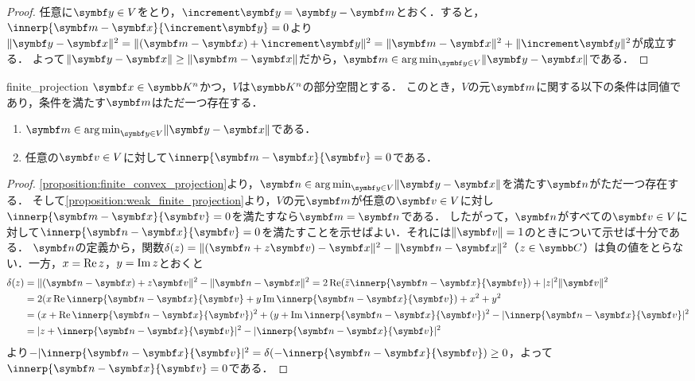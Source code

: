 \documentclass[../../main]{subfiles}
\begin{document}
\begin{proof}
  任意に\(\vect{y}\in V\)をとり，\(\increment\vect{y}=\vect{y}-\vect{m}\)とおく．すると，\(\innerp{\vect{m}-\vect{x}}{\increment\vect{y}}=0\)より
  \(\vnorm{\vect{y}-\vect{x}}^2=\vnorm{(\vect{m}-\vect{x})+\increment\vect{y}}^2=\vnorm{\vect{m}-\vect{x}}^2+\vnorm{\increment\vect{y}}^2\)が成立する．
  よって\(\vnorm{\vect{y}-\vect{x}}\geq\vnorm{\vect{m}-\vect{x}}\)だから，\(\vect{m}\in\argmin_{\vect{y}\in V}\vnorm{\vect{y}-\vect{x}}\)である．
\end{proof}

\begin{proposition}{}{finite_projection}
  \(\vect{x}\in\numset{K}^n\)かつ，\(V\)は\(\numset{K}^n\)の部分空間とする．
  このとき，\(V\)の元\(\vect{m}\)に関する以下の条件は同値であり，条件を満たす\(\vect{m}\)はただ一つ存在する．
  \begin{enumerate}
    \item \(\vect{m}\in\argmin_{\vect{y}\in V}\vnorm{\vect{y}-\vect{x}}\)である．
    \item 任意の\(\vect{v}\in V\)に対して\(\innerp{\vect{m}-\vect{x}}{\vect{v}}=0\)である．
  \end{enumerate}
\end{proposition}

\begin{proof}
  \cref{proposition:finite_convex_projection}より，\(\vect{n}\in\argmin_{\vect{y}\in V}\vnorm{\vect{y}-\vect{x}}\)を満たす\(\vect{n}\)がただ一つ存在する．
  そして\cref{proposition:weak_finite_projection}より，\(V\)の元\(\vect{m}\)が任意の\(\vect{v}\in V\)に対し\(\innerp{\vect{m}-\vect{x}}{\vect{v}}=0\)を満たすなら\(\vect{m}=\vect{n}\)である．
  したがって，\(\vect{n}\)がすべての\(\vect{v}\in V\)に対して\(\innerp{\vect{n}-\vect{x}}{\vect{v}}=0\)を満たすことを示せばよい．それには\(\vnorm{\vect{v}}=1\)のときについて示せば十分である．
  \(\vect{n}\)の定義から，関数\(\delta(z)=\vnorm{(\vect{n}+z\vect{v})-\vect{x}}^2-\vnorm{\vect{n}-\vect{x}}^2\)（\(z\in\numset{C}\)）は負の値をとらない．一方，\(x=\operatorname{Re} z\)，\(y=\operatorname{Im} z\)とおくと
  \begin{align*}
    \delta(z) &= \vnorm{(\vect{n}-\vect{x})+z\vect{v}}^2-\vnorm{\vect{n}-\vect{x}}^2
    = 2\rpart(\conj{z}\innerp{\vect{n}-\vect{x}}{\vect{v}})+\abs{z}^2\vnorm{\vect{v}}^2 \\
    &= 2(x\rpart\innerp{\vect{n}-\vect{x}}{\vect{v}}+y\ipart\innerp{\vect{n}-\vect{x}}{\vect{v}})+x^2+y^2 \\
    &= (x+\rpart\innerp{\vect{n}-\vect{x}}{\vect{v}})^2+(y+\ipart\innerp{\vect{n}-\vect{x}}{\vect{v}})^2-\abs{\innerp{\vect{n}-\vect{x}}{\vect{v}}}^2 \\
    &= \abs{z+\innerp{\vect{n}-\vect{x}}{\vect{v}}}^2-\abs{\innerp{\vect{n}-\vect{x}}{\vect{v}}}^2
  \end{align*}
  より\(-\abs{\innerp{\vect{n}-\vect{x}}{\vect{v}}}^2=\delta(-\innerp{\vect{n}-\vect{x}}{\vect{v}})\geq 0\)，よって\(\innerp{\vect{n}-\vect{x}}{\vect{v}}=0\)である．
\end{proof}
\end{document}
